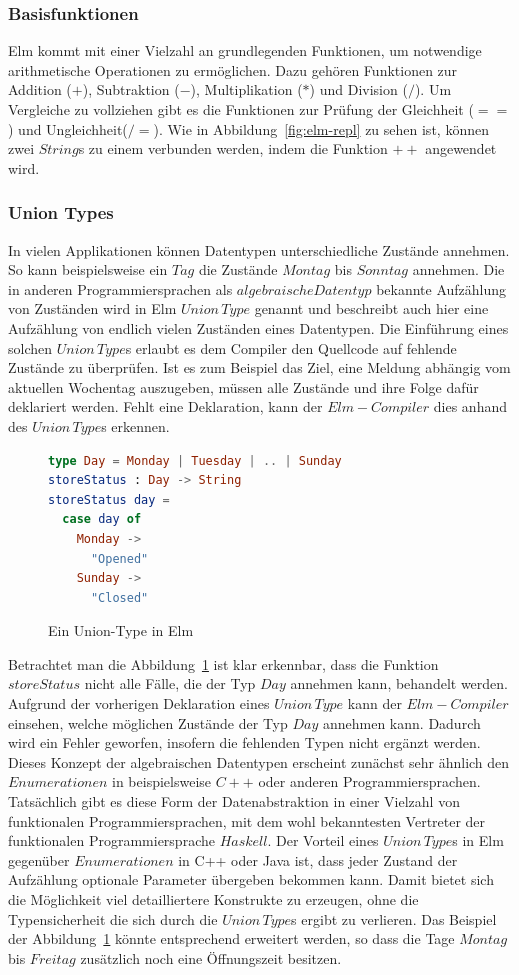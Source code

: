 \subsubsection{Basisfunktionen}
\label{sec:Basisfunktionen}
Elm kommt mit einer Vielzahl an grundlegenden Funktionen, um notwendige arithmetische Operationen zu ermöglichen. Dazu gehören Funktionen zur Addition ($+$), Subtraktion ($-$), Multiplikation ($*$) und Division ($/$). Um Vergleiche zu vollziehen gibt es die Funktionen zur Prüfung der Gleichheit ($==$) und Ungleichheit($/=$). Wie in Abbildung~\ref{fig:elm-repl} zu sehen ist, können zwei $String$s zu einem verbunden werden, indem die Funktion $++$ angewendet wird.

\subsubsection{Union Types}
\label{sec:Union-Types}
In vielen Applikationen können Datentypen unterschiedliche Zustände annehmen. So kann beispielsweise ein $Tag$ die Zustände $Montag$ bis $Sonntag$ annehmen. Die in anderen Programmiersprachen als $algebraische Datentyp$ bekannte Aufzählung von Zuständen wird in Elm $Union\,Type$ genannt und beschreibt auch hier eine Aufzählung von endlich vielen Zuständen eines Datentypen. Die Einführung eines solchen $Union\,Type$s erlaubt es dem Compiler den Quellcode auf fehlende Zustände zu überprüfen. Ist es zum Beispiel das Ziel, eine Meldung abhängig vom aktuellen Wochentag auszugeben, müssen alle Zustände und ihre Folge dafür deklariert werden. Fehlt eine Deklaration, kann der $Elm-Compiler$ dies anhand des $Union\,Type$s erkennen.
\begin{figure}[h]
\begin{lstlisting}[language=Elm]
type Day = Monday | Tuesday | .. | Sunday
storeStatus : Day -> String
storeStatus day =
  case day of
    Monday ->
      "Opened"
    Sunday ->
      "Closed"
\end{lstlisting}
\caption{Ein Union-Type in Elm}\label{fig:elm-union-type}
\end{figure}
Betrachtet man die Abbildung~\ref{fig:elm-union-type} ist klar erkennbar, dass die Funktion $storeStatus$ nicht alle Fälle, die der Typ $Day$ annehmen kann, behandelt werden. Aufgrund der vorherigen Deklaration eines $Union\,Type$ kann der $Elm-Compiler$ einsehen, welche möglichen Zustände der Typ $Day$ annehmen kann. Dadurch wird ein Fehler geworfen, insofern die fehlenden Typen nicht ergänzt werden. Dieses Konzept der algebraischen Datentypen erscheint zunächst sehr ähnlich den $Enumerationen$ in beispielsweise $C++$ oder anderen Programmiersprachen. Tatsächlich gibt es diese Form der Datenabstraktion in einer Vielzahl von funktionalen Programmiersprachen, mit dem wohl bekanntesten Vertreter der funktionalen Programmiersprache $Haskell$. Der Vorteil eines $Union\,Type$s in Elm gegenüber $Enumerationen$ in C++ oder Java ist, dass jeder Zustand der Aufzählung optionale Parameter übergeben bekommen kann. Damit bietet sich die Möglichkeit viel detailliertere Konstrukte zu erzeugen, ohne die Typensicherheit die sich durch die $Union\,Type$s ergibt zu verlieren. Das Beispiel der Abbildung~\ref{fig:elm-union-type} könnte entsprechend erweitert werden, so dass die Tage $Montag$ bis $Freitag$ zusätzlich noch eine Öffnungszeit besitzen.
